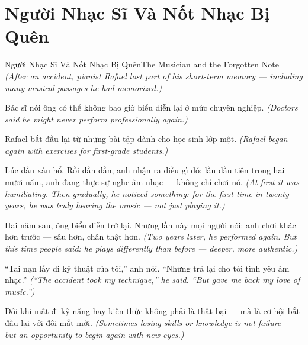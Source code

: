 \section{Người Nhạc Sĩ Và Nốt Nhạc Bị Quên}
\begin{truyen}{Người Nhạc Sĩ Và Nốt Nhạc Bị Quên}{The Musician and the Forgotten Note}
\textit{(After an accident, pianist Rafael lost part of his short-term memory — including many musical passages he had memorized.)}

Bác sĩ nói ông có thể không bao giờ biểu diễn lại ở mức chuyên nghiệp.
\textit{(Doctors said he might never perform professionally again.)}

Rafael bắt đầu lại từ những bài tập dành cho học sinh lớp một.
\textit{(Rafael began again with exercises for first-grade students.)}

Lúc đầu xấu hổ. Rồi dần dần, anh nhận ra điều gì đó: lần đầu tiên trong hai mươi năm, anh đang thực sự nghe âm nhạc — không chỉ chơi nó.
\textit{(At first it was humiliating. Then gradually, he noticed something: for the first time in twenty years, he was truly hearing the music — not just playing it.)}

Hai năm sau, ông biểu diễn trở lại. Nhưng lần này mọi người nói: anh chơi khác hơn trước — sâu hơn, chân thật hơn.
\textit{(Two years later, he performed again. But this time people said: he plays differently than before — deeper, more authentic.)}

``Tai nạn lấy đi kỹ thuật của tôi,'' anh nói. ``Nhưng trả lại cho tôi tình yêu âm nhạc.''
\textit{(``The accident took my technique,'' he said. ``But gave me back my love of music.'')}

\end{truyen}

\begin{baihoc}
Đôi khi mất đi kỹ năng hay kiến thức không phải là thất bại — mà là cơ hội bắt đầu lại với đôi mắt mới.
\textit{(Sometimes losing skills or knowledge is not failure — but an opportunity to begin again with new eyes.)}
\end{baihoc}
\ngancach

